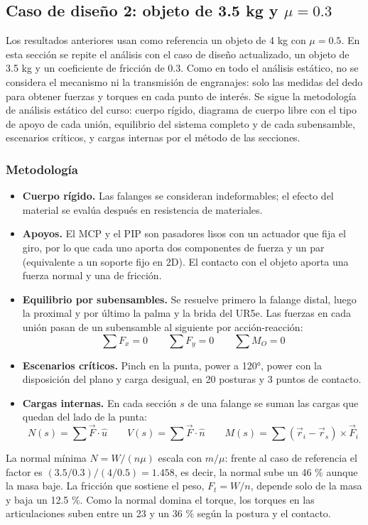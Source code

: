 \documentclass[11pt,letterpaper]{article}
\newcommand{\eq}[1]{{\boldmath\begin{equation*}#1\end{equation*}}}
\begin{document}
\subsection{Caso de diseño 2: objeto de 3.5 kg y $\mu = 0.3$}
Los resultados anteriores usan como referencia un objeto de 4 kg con $\mu = 0.5$. En esta sección se repite el análisis con el caso de diseño actualizado, un objeto de 3.5 kg y un coeficiente de fricción de 0.3. Como en todo el análisis estático, no se considera el mecanismo ni la transmisión de engranajes: solo las medidas del dedo para obtener fuerzas y torques en cada punto de interés. Se sigue la metodología de análisis estático del curso: cuerpo rígido, diagrama de cuerpo libre con el tipo de apoyo de cada unión, equilibrio del sistema completo y de cada subensamble, escenarios críticos, y cargas internas por el método de las secciones.

\subsubsection{Metodología}
\begin{itemize}
\item \textbf{Cuerpo rígido.} Las falanges se consideran indeformables; el efecto del material se evalúa después en resistencia de materiales.
\item \textbf{Apoyos.} El MCP y el PIP son pasadores lisos con un actuador que fija el giro, por lo que cada uno aporta dos componentes de fuerza y un par (equivalente a un soporte fijo en 2D). El contacto con el objeto aporta una fuerza normal y una de fricción.
\item \textbf{Equilibrio por subensambles.} Se resuelve primero la falange distal, luego la proximal y por último la palma y la brida del UR5e. Las fuerzas en cada unión pasan de un subensamble al siguiente por acción-reacción:
\eq{\sum F_x = 0 \qquad \sum F_y = 0 \qquad \sum M_O = 0}
\item \textbf{Escenarios críticos.} Pinch en la punta, power a 120°, power con la disposición del plano y carga desigual, en 20 posturas y 3 puntos de contacto.
\item \textbf{Cargas internas.} En cada sección $s$ de una falange se suman las cargas que quedan del lado de la punta:
\eq{N(s) = \sum \vec F\cdot\hat u \qquad V(s) = \sum \vec F\cdot\hat n \qquad M(s) = \sum (\vec r_i - \vec r_s)\times\vec F_i}
\end{itemize}

La normal mínima $N = W/(n\mu)$ escala con $m/\mu$: frente al caso de referencia el factor es $(3.5/0.3)/(4/0.5) = 1.458$, es decir, la normal sube un 46 \% aunque la masa baje. La fricción que sostiene el peso, $F_t = W/n$, depende solo de la masa y baja un 12.5 \%. Como la normal domina el torque, los torques en las articulaciones suben entre un 23 y un 36 \% según la postura y el contacto.
\end{document}
